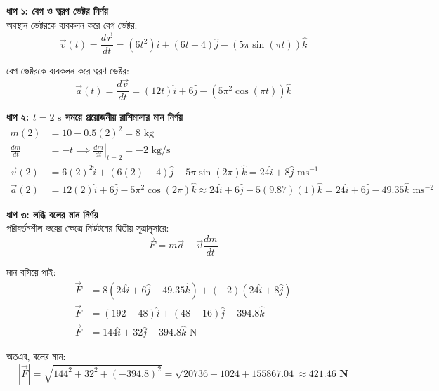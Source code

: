 \documentclass[12pt, a4paper]{article}
\begin{document}
\begin{tcolorbox}[solutionbox={সমাধান (Solution)}]
\noindent
\textbf{ধাপ ১: বেগ ও ত্বরণ ভেক্টর নির্ণয়} \\
অবস্থান ভেক্টরকে ব্যবকলন করে বেগ ভেক্টর:
\[\vec{v}(t) = \frac{d\vec{r}}{dt} = (6t^2)\hat{i} + (6t - 4)\hat{j} - (5\pi\sin(\pi t))\hat{k}\]

বেগ ভেক্টরকে ব্যবকলন করে ত্বরণ ভেক্টর:
\[\vec{a}(t) = \frac{d\vec{v}}{dt} = (12t)\hat{i} + 6\hat{j} - (5\pi^2\cos(\pi t))\hat{k}\]

\vspace{0.5em}
\noindent\textbf{ধাপ ২: $t = 2\text{ s}$ সময়ে প্রয়োজনীয় রাশিমালার মান নির্ণয়} \\
\begin{align*}
    m(2) &= 10 - 0.5(2)^2 = 8\text{ kg} \\
    \frac{dm}{dt} &= -t \implies \left.\frac{dm}{dt}\right|_{t=2} = -2\text{ kg/s} \\
    \vec{v}(2) &= 6(2)^2\hat{i} + (6(2) - 4)\hat{j} - 5\pi\sin(2\pi)\hat{k} = 24\hat{i} + 8\hat{j}\text{ ms}^{-1} \\
    \vec{a}(2) &= 12(2)\hat{i} + 6\hat{j} - 5\pi^2\cos(2\pi)\hat{k} \approx 24\hat{i} + 6\hat{j} - 5(9.87)(1)\hat{k} = 24\hat{i} + 6\hat{j} - 49.35\hat{k}\text{ ms}^{-2}
\end{align*}

\vspace{0.5em}
\noindent\textbf{ধাপ ৩: লব্ধি বলের মান নির্ণয়} \\
পরিবর্তনশীল ভরের ক্ষেত্রে নিউটনের দ্বিতীয় সূত্রানুসারে:
\[\vec{F} = m\vec{a} + \vec{v}\frac{dm}{dt}\]

মান বসিয়ে পাই:
\begin{align*}
    \vec{F} &= 8(24\hat{i} + 6\hat{j} - 49.35\hat{k}) + (-2)(24\hat{i} + 8\hat{j}) \\
    \vec{F} &= (192 - 48)\hat{i} + (48 - 16)\hat{j} - 394.8\hat{k} \\
    \vec{F} &= 144\hat{i} + 32\hat{j} - 394.8\hat{k}\text{ N}
\end{align*}

অতএব, বলের মান:
\[|\vec{F}| = \sqrt{144^2 + 32^2 + (-394.8)^2} = \sqrt{20736 + 1024 + 155867.04} \approx \mathbf{421.46\text{ N}}\]
\end{tcolorbox}
\end{document}
